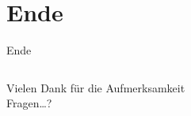 \documentclass[ngerman,compress,hyperref={bookmarks}]{beamer}
\begin{document}
\part{Ende}
\begin{frame}{Ende}
\begin{columns}[t]
\begin{column}{0.5\textwidth}
 \begin{center}
 \vspace{1cm}
 Vielen Dank für die Aufmerksamkeit\\
 \vspace{1.5cm}
 Fragen\ldots?
 \end{center}
\end{column}
\begin{column}{0.5\textwidth}
 \vspace{-1cm}
 \begin{figure}
  \label{asngraph_all}
 \end{figure}
\end{column}
\end{columns}
\end{frame}
\end{document}
